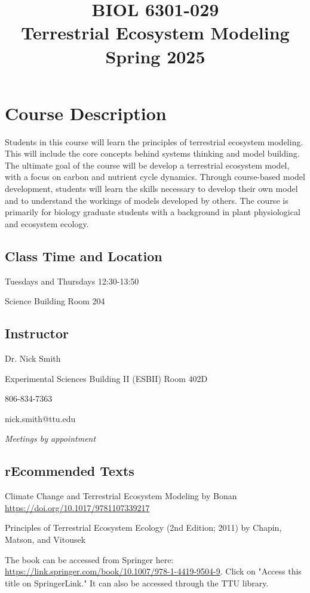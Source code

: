 \documentclass[12pt, notitlepage]{article}   	%
\title{
	\textbf{
		BIOL 6301-029
	} \\
	\large Terrestrial Ecosystem Modeling \\
	\large Spring 2025
}
\date{\vspace{-5ex}}
\begin{document}
{\selectfont %

\maketitle

\section{Course Description}
Students in this course will learn the principles of terrestrial ecosystem modeling.
This will include the core concepts behind systems thinking and model building.
The ultimate goal of the course will be develop a terrestrial ecosystem model, with
a focus on carbon and nutrient cycle dynamics. Through course-based model development,
students will learn the skills necessary to develop their own model and to understand
the workings of models developed by others. The course is primarily for biology
graduate students with a background in plant physiological and ecosystem ecology.

\subsection{Class Time and Location}
Tuesdays and Thursdays 12:30-13:50

Science Building Room 204

\newpage

\subsection{Instructor}
Dr. Nick Smith \par
Experimental Sciences Building II (ESBII) Room 402D \par
806-834-7363 \par
nick.smith@ttu.edu \par
\textit{Meetings by appointment}

\subsection{rEcommended Texts}
Climate Change and Terrestrial Ecosystem Modeling
by Bonan
\url{https://doi.org/10.1017/9781107339217}\par

Principles of Terrestrial Ecosystem Ecology (2nd Edition; 2011) 
by Chapin, Matson, and Vitousek \par
The book can be accessed from Springer here: 
\url{https://link.springer.com/book/10.1007/978-1-4419-9504-9}. Click on "Access this title on 
SpringerLink." It can also be accessed through the TTU library.

}
\end{document}
